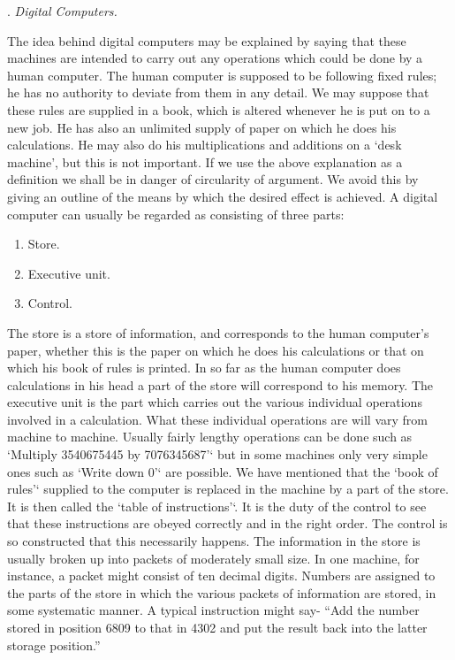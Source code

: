 \documentclass[10pt]{article} %
\begin{document}
\vspace{0.5\baselineskip} %
\noindent{}. \textit{Digital Computers.}
\vspace{0.5\baselineskip} %

The idea behind digital computers may be explained by saying that these machines are intended to carry out any operations which could be done by a human computer. The human computer is supposed to be following fixed rules; he has no authority to deviate from them in any detail. We may suppose that these rules are supplied in a book, which is altered whenever he is put on to a new job. He has also an unlimited supply of paper on which he does his calculations. He may also do his multiplications and additions on a `desk machine', but this is not important.
If we use the above explanation as a definition we shall be in danger of circularity of argument. We avoid this by giving an outline of the means by which the desired effect is achieved. A digital computer can usually be regarded as consisting of three parts:
\begin{enumerate}[label=(\roman*)]
    \item Store.
    \item Executive unit.
    \item Control.
\end{enumerate}
The store is a store of information, and corresponds to the human computer's paper, whether this is the paper on which he does his calculations or that on which his book of rules is printed. In so far as the human computer does calculations in his head a part of the store will correspond to his memory.
The executive unit is the part which carries out the various individual operations involved in a calculation. What these individual operations are will vary from machine to machine. Usually fairly lengthy operations can be done such as `Multiply 3540675445 by 7076345687'` but in some machines only very simple ones such as `Write down 0'` are possible.
We have mentioned that the `book of rules'` supplied to the computer is replaced in the machine by a part of the store. It is then called the `table of instructions'`. It is the duty of the control to see that these instructions are obeyed correctly and in the right order. The control is so constructed that this necessarily happens.
The information in the store is usually broken up into packets of moderately small size. In one machine, for instance, a packet might consist of ten decimal digits. Numbers are assigned to the parts of the store in which the various packets of information are stored, in some systematic manner. A typical instruction might say-
\vspace{0.2\baselineskip} %
``Add the number stored in position 6809 to that in 4302 and put the result back into the latter storage position.''\par %
\vspace{0.5\baselineskip} %
\end{document}

